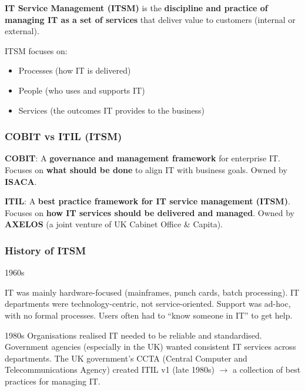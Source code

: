 \indent

\noindent\textbf{IT Service Management (ITSM)} is the \textbf{discipline and practice of managing IT as a set of services} that deliver value to customers (internal or external).

\bigskip

ITSM focuses on:

\begin{itemize}
    \item Processes (how IT is delivered)
    \item People (who uses and supports IT)
    \item Services (the outcomes IT provides to the business)
\end{itemize}

\subsubsection{COBIT vs ITIL (ITSM)}

\indent 

\noindent\textbf{COBIT}: A \textbf{governance and management framework} for enterprise IT. Focuses on \textbf{what should be done} to align IT with business goals. Owned by \textbf{ISACA}.

\noindent\textbf{ITIL}: A \textbf{best practice framework for IT service management (ITSM)}. Focuses on \textbf{how IT services should be delivered and managed}. Owned by \textbf{AXELOS} (a joint venture of UK Cabinet Office \& Capita).

\subsubsection{History of ITSM}

\noindent 1960s

IT was mainly hardware-focused (mainframes, punch cards, batch processing). IT departments were technology-centric, not service-oriented. Support was ad-hoc, with no formal processes. Users often had to “know someone in IT” to get help.

\bigskip

\noindent 1980s
Organisations realised IT needed to be reliable and standardised. Government agencies (especially in the UK) wanted consistent IT services across departments. The UK government’s CCTA (Central Computer and Telecommunications Agency) created ITIL v1 (late 1980s) $\xrightarrow{}$ a collection of best practices for managing IT.

\bigskip

